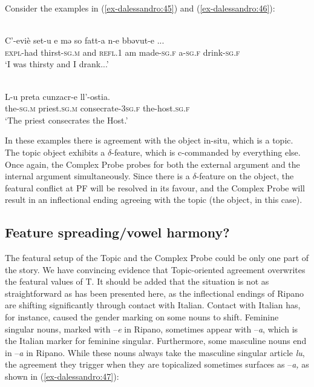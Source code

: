 \documentclass[output=paper
,modfonts
,nonflat]{langsci/langscibook}
\begin{document}
Consider the examples in (\ref{ex-dalessandro:45}) and (\ref{ex-dalessandro:46}):

\begin{exe}
	\ex \label{ex-dalessandro:45}\citet[59]{Rossi2008}\\
	\gll C’-eviè   set-u     e   mə   so   fatt-a     n-e   bbəvut-e ...\\
	\textsc{expl-}had  thirst-\textsc{sg.m} and  \textsc{refl.1} am  made-\textsc{sg.f} a-\textsc{sg.f} drink-\textsc{sg.f}\\
	\glt `I was thirsty and I drank...'
\end{exe}
\begin{exe}
	\ex\label{ex-dalessandro:46}\citet[87]{Rossi2008}\\
	\gll L-u   preta     cunzacr-e     ll’-ostia.\\
	the-\textsc{sg.m} priest.\textsc{sg.m} consecrate-\textsc{3sg.f} the-host.\textsc{sg.f}\\
	\glt `The priest consecrates the Host.'
\end{exe}
In these examples there is agreement with the object in-situ, which is a topic. The topic object exhibits a $\delta $-feature, which is c-commanded by everything else. Once again, the Complex Probe probes for both the external argument and the internal argument simultaneously. Since there is a $\delta $-feature on the object, the featural conflict at PF will be resolved in its favour, and the Complex Probe will result in an inflectional ending agreeing with the topic (the object, in this case).

\subsection{Feature spreading/vowel harmony?}\label{sec-dalessandro:5.3}
The featural setup of the Topic and the Complex Probe could be only one part of the story. We have convincing evidence that Topic-oriented agreement overwrites the featural values of T. It should be added that the situation is not as straightforward as has been presented here, as the inflectional endings of Ripano are shifting significantly through contact with Italian.
Contact with Italian has, for instance, caused the gender marking on some nouns to shift. Feminine singular nouns, marked with –\textit{e} in Ripano, sometimes appear with –\textit{a}, which is the Italian marker for feminine singular. Furthermore, some masculine nouns end in –\textit{a} in Ripano. While these nouns always take the masculine singular article \textit{lu}, the agreement they trigger when they are topicalized sometimes surfaces as –\textit{a,}  as shown in (\ref{ex-dalessandro:47}):
\end{document}

